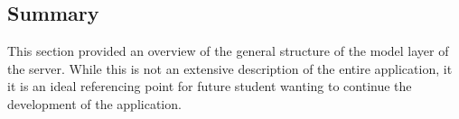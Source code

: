 \subsection{Summary}
This section provided an overview of the general structure of the model layer of the server. While this is not an extensive description of the entire application, it it is an ideal referencing point for future student wanting to continue the development of the application.